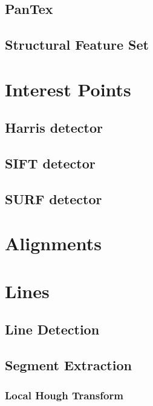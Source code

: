 

\subsection{PanTex}


\subsection{Structural Feature Set}


\section{Interest Points}
\subsection{Harris detector}

\subsection{SIFT detector}
\label{sec:SIFTDetector}

\subsection{SURF detector}


\section{Alignments}
\label{sec:Alignments}

\section{Lines}
\label{sec:LineDetectors}

\subsection{Line Detection}
\label{sec:LineDetection}






\subsection{Segment Extraction}
\label{sec:SegmentExtraction}
\subsubsection{Local Hough Transform}

%
%
